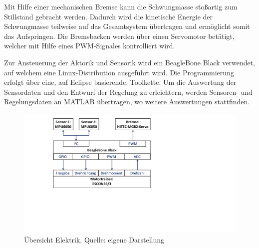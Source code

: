 Mit Hilfe einer mechanischen Bremse kann die Schwungmasse stoßartig zum Stillstand gebracht werden. Dadurch wird die kinetische Energie der Schwungmasse teilweise auf das Gesamtsystem übertragen und ermöglicht somit das Aufspringen. Die Bremsbacken werden über einen Servomotor betätigt, welcher mit Hilfe eines PWM-Signales kontrolliert wird.
\newline

Zur Ansteuerung der Aktorik und Sensorik wird ein BeagleBone Black verwendet, auf welchem eine Linux-Distribution ausgeführt wird. Die Programmierung erfolgt über eine, auf Eclipse basierende, Toolkette. Um die Auswertung der Sensordaten und den Entwurf der Regelung zu erleichtern, werden Sensoren- und Regelungsdaten an MATLAB übertragen, wo weitere Auswertungen stattfinden.


\begin{figure}[!h]
\centering
\includegraphics[width=0.7\linewidth, trim={2cm 7cm 11cm 0cm},clip]{img/ElekAufbau_Bauteile}
\caption{Übersicht Elektrik, Quelle: eigene Darstellung}

\end{figure}